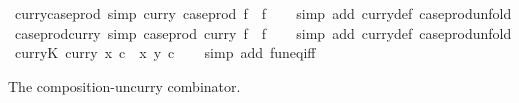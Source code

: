 \begin{isabellebody}
\endisatagproof
{\isafoldproof}%
%
\isadelimproof
\isanewline
%
\endisadelimproof
\isanewline
{}\isamarkupfalse%
\ curry{\isacharunderscore}{\kern0pt}case{\isacharunderscore}{\kern0pt}prod\ {\isacharbrackleft}{\kern0pt}simp{\isacharbrackright}{\kern0pt}{\isacharcolon}{\kern0pt}\ {\isachardoublequoteopen}curry\ {\isacharparenleft}{\kern0pt}case{\isacharunderscore}{\kern0pt}prod\ f{\isacharparenright}{\kern0pt}\ {\isacharequal}{\kern0pt}\ f{\isachardoublequoteclose}\isanewline
%
\isadelimproof
\ \ %
\endisadelimproof
%
\isatagproof
{}\isamarkupfalse%
\ {\isacharparenleft}{\kern0pt}simp\ add{\isacharcolon}{\kern0pt}\ curry{\isacharunderscore}{\kern0pt}def\ case{\isacharunderscore}{\kern0pt}prod{\isacharunderscore}{\kern0pt}unfold{\isacharparenright}{\kern0pt}%
\endisatagproof
{\isafoldproof}%
%
\isadelimproof
\isanewline
%
\endisadelimproof
\isanewline
{}\isamarkupfalse%
\ case{\isacharunderscore}{\kern0pt}prod{\isacharunderscore}{\kern0pt}curry\ {\isacharbrackleft}{\kern0pt}simp{\isacharbrackright}{\kern0pt}{\isacharcolon}{\kern0pt}\ {\isachardoublequoteopen}case{\isacharunderscore}{\kern0pt}prod\ {\isacharparenleft}{\kern0pt}curry\ f{\isacharparenright}{\kern0pt}\ {\isacharequal}{\kern0pt}\ f{\isachardoublequoteclose}\isanewline
%
\isadelimproof
\ \ %
\endisadelimproof
%
\isatagproof
{}\isamarkupfalse%
\ {\isacharparenleft}{\kern0pt}simp\ add{\isacharcolon}{\kern0pt}\ curry{\isacharunderscore}{\kern0pt}def\ case{\isacharunderscore}{\kern0pt}prod{\isacharunderscore}{\kern0pt}unfold{\isacharparenright}{\kern0pt}%
\endisatagproof
{\isafoldproof}%
%
\isadelimproof
\isanewline
%
\endisadelimproof
\isanewline
{}\isamarkupfalse%
\ curry{\isacharunderscore}{\kern0pt}K{\isacharcolon}{\kern0pt}\ {\isachardoublequoteopen}curry\ {\isacharparenleft}{\kern0pt}{\isasymlambda}x{\isachardot}{\kern0pt}\ c{\isacharparenright}{\kern0pt}\ {\isacharequal}{\kern0pt}\ {\isacharparenleft}{\kern0pt}{\isasymlambda}x\ y{\isachardot}{\kern0pt}\ c{\isacharparenright}{\kern0pt}{\isachardoublequoteclose}\isanewline
%
\isadelimproof
\ \ %
\endisadelimproof
%
\isatagproof
{}\isamarkupfalse%
\ {\isacharparenleft}{\kern0pt}simp\ add{\isacharcolon}{\kern0pt}\ fun{\isacharunderscore}{\kern0pt}eq{\isacharunderscore}{\kern0pt}iff{\isacharparenright}{\kern0pt}%
\endisatagproof
{\isafoldproof}%
%
\isadelimproof
%
\endisadelimproof
%
\begin{isamarkuptext}%
The composition-uncurry combinator.%
\end{isamarkuptext}\isamarkuptrue%
\isamarkupfalse%

\end{isabellebody}
